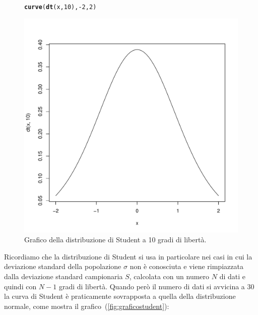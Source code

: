\documentclass[onecolumn,12pt]{book}\usepackage[]{graphicx}\usepackage[]{color}
\makeatletter
\def\maxwidth{ %
  \ifdim\Gin@nat@width>\linewidth
    \linewidth
  \else
    \Gin@nat@width
  \fi
}
\newcommand{\hlnum}[1]{\textcolor[rgb]{0.686,0.059,0.569}{#1}}%
\newcommand{\hlopt}[1]{\textcolor[rgb]{0,0,0}{#1}}%
\newcommand{\hlstd}[1]{\textcolor[rgb]{0.345,0.345,0.345}{#1}}%
\newcommand{\hlkwd}[1]{\textcolor[rgb]{0.737,0.353,0.396}{\textbf{#1}}}%
\newenvironment{kframe}{%
 \def\at@end@of@kframe{}%
 \ifinner\ifhmode%
  \def\at@end@of@kframe{\end{minipage}}%
  \begin{minipage}{\columnwidth}%
 \fi\fi%
 \def\FrameCommand##1{\hskip\@totalleftmargin \hskip-\fboxsep
 \colorbox{shadecolor}{##1}\hskip-\fboxsep
     \hskip-\linewidth \hskip-\@totalleftmargin \hskip\columnwidth}%
 \MakeFramed {\advance\hsize-\width
   \@totalleftmargin\z@ \linewidth\hsize
   \@setminipage}}%
 {\par\unskip\endMakeFramed%
 \at@end@of@kframe}
\newenvironment{knitrout}{}{} %
\makeatother
\begin{document}
\begin{figure}[H]
\begin{center}
\begin{knitrout}
\color{fgcolor}\begin{kframe}
\begin{alltt}
\hlkwd{curve}\hlstd{(}\hlkwd{dt}\hlstd{(x,}\hlnum{10}\hlstd{),}\hlopt{-}\hlnum{2}\hlstd{,}\hlnum{2}\hlstd{)}
\end{alltt}
\end{kframe}
\includegraphics[width=\maxwidth]{figure/unnamed-chunk-151-1} 

\end{knitrout}
\caption{Grafico della distribuzione di Student a 10 gradi di libert\`a. }
\label{fig:graficostudent1}
\end{center}
\end{figure}
Ricordiamo che la distribuzione di Student si usa in  particolare nei casi in cui la deviazione standard della popolazione $\sigma$  non \`e conosciuta e viene rimpiazzata  dalla deviazione standard campionaria  $S$, calcolata con un numero $N$ di dati e quindi con $N-1$ gradi di libert\`a. Quando per\`o il numero di dati si avvicina a 30 la curva di Student \`e praticamente sovrapposta a quella della distribuzione normale, come mostra il grafico~(\ref{fig:graficostudent}):
\end{document}
